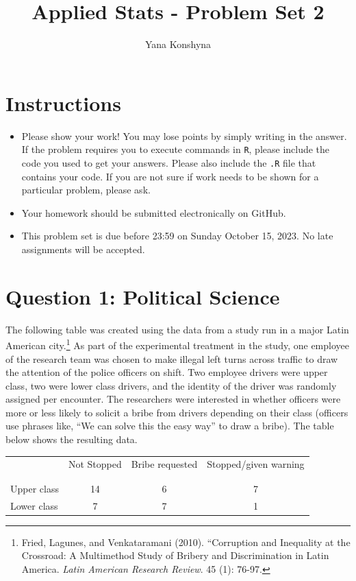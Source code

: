 \documentclass[12pt,letterpaper]{article}
\title{Applied Stats - Problem Set 2}
\author{Yana Konshyna}
\begin{document}
	\maketitle
	\section*{Instructions}
\begin{itemize}
	\item Please show your work! You may lose points by simply writing in the answer. If the problem requires you to execute commands in \texttt{R}, please include the code you used to get your answers. Please also include the \texttt{.R} file that contains your code. If you are not sure if work needs to be shown for a particular problem, please ask.
	\item Your homework should be submitted electronically on GitHub.
	\item This problem set is due before 23:59 on Sunday October 15, 2023. No late assignments will be accepted.

\end{itemize}

	
	\vspace{.5cm}
	\section*{Question 1: Political Science}
		\vspace{.25cm}
	The following table was created using the data from a study run in a major Latin American city.\footnote{Fried, Lagunes, and Venkataramani (2010). ``Corruption and Inequality at the Crossroad: A Multimethod Study of Bribery and Discrimination in Latin America. \textit{Latin American Research Review}. 45 (1): 76-97.} As part of the experimental treatment in the study, one employee of the research team was chosen to make illegal left turns across traffic to draw the attention of the police officers on shift. Two employee drivers were upper class, two were lower class drivers, and the identity of the driver was randomly assigned per encounter. The researchers were interested in whether officers were more or less likely to solicit a bribe from drivers depending on their class (officers use phrases like, ``We can solve this the easy way'' to draw a bribe). The table below shows the resulting data.

\newpage
\begin{table}[h!]
	\centering
	\begin{tabular}{l | c c c }
		& Not Stopped & Bribe requested & Stopped/given warning \\
		\\[-1.8ex] 
		\hline \\[-1.8ex]
		Upper class & 14 & 6 & 7 \\
		Lower class & 7 & 7 & 1 \\
		\hline
	\end{tabular}
\end{table}
\end{document}
